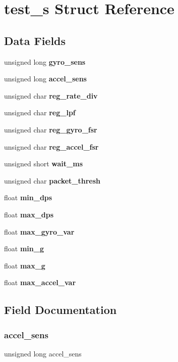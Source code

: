 \section{test\+\_\+s Struct Reference}
\label{structtest__s}
\subsection*{Data Fields}
\begin{DoxyCompactItemize}
\item 
unsigned long \textbf{ gyro\+\_\+sens}
\item 
unsigned long \textbf{ accel\+\_\+sens}
\item 
unsigned char \textbf{ reg\+\_\+rate\+\_\+div}
\item 
unsigned char \textbf{ reg\+\_\+lpf}
\item 
unsigned char \textbf{ reg\+\_\+gyro\+\_\+fsr}
\item 
unsigned char \textbf{ reg\+\_\+accel\+\_\+fsr}
\item 
unsigned short \textbf{ wait\+\_\+ms}
\item 
unsigned char \textbf{ packet\+\_\+thresh}
\item 
float \textbf{ min\+\_\+dps}
\item 
float \textbf{ max\+\_\+dps}
\item 
float \textbf{ max\+\_\+gyro\+\_\+var}
\item 
float \textbf{ min\+\_\+g}
\item 
float \textbf{ max\+\_\+g}
\item 
float \textbf{ max\+\_\+accel\+\_\+var}
\end{DoxyCompactItemize}


\subsection{Field Documentation}
\mbox{\label{structtest__s_a22a1d8ebbceb431baa0dfdc911fbc8ab}} 
\subsubsection{accel\+\_\+sens}
{\footnotesize\ttfamily unsigned long accel\+\_\+sens}

\mbox{\label{structtest__s_a32da1174cf6569aa99bdff70055bb45a}} 
